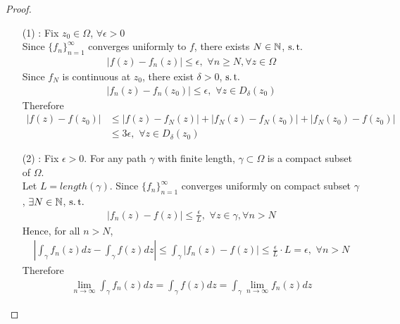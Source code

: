 \begin{thm}
	\newpage
	\begin{proof}
		\begin{enumerate}
			\item[(1)]: Fix $z_0 \in \Omega$, $\forall \epsilon > 0$\\
			Since $\{f_n\}_{n = 1}^{\infty}$ converges uniformly to $f$, there exists $N \in \mathbb{N}$, $\operatorname{s.t.}$
			\begin{align}
				\left| f(z) - f_{n}(z) \right| \leq \epsilon , \,\, \forall n \geq N , \forall z \in \Omega
			\end{align}
			Since $f_N$ is continuous at $z_0$, there exist $\delta > 0$, $\operatorname{s.t.}$
			\begin{align}
				\left| f_{n}(z) - f_{n}(z_0) \right| \leq \epsilon , \,\, \forall z \in D_{\delta}(z_0)
			\end{align}
			Therefore
			\begin{align}
				\left| f(z) - f(z_0) \right| 
				&\leq \left| f(z) - f_{N}(z) \right| + \left| f_{N}(z) - f_{N}(z_0) \right| + \left| f_{N}(z_0) - f(z_0) \right| \\
				&\leq 3 \epsilon , \,\, \forall z \in D_{\delta}(z_0)
			\end{align}
			
			\vspace{2em}
			
			\item[(2)]: Fix $\epsilon > 0$. For any path $\gamma$ with finite length, $\gamma \subset \Omega$ is a compact subset of $\Omega$.\\
			Let $L = length(\gamma)$. Since $\{ f_n \}_{n = 1}^{\infty}$ converges uniformly on compact subset $\gamma$, $\exists N \in \mathbb{N}$, $\operatorname{s.t.}$
			\begin{align}
				\left| f_{n}(z) - f(z) \right| \leq \frac{\epsilon}{L} , \,\, \forall z \in \gamma , \forall n > N
			\end{align}
			Hence, for all $n > N$,
			\begin{align}
				\left| \int_{\gamma}{f_{n}(z) dz} - \int_{\gamma}{f(z) dz} \right| \leq \int_{\gamma}{\left| f_{n}(z) - f(z) \right|} \leq \frac{\epsilon}{L} \cdot L = \epsilon , \,\, \forall n > N
			\end{align}
			Therefore
			\begin{align}
				\lim_{n \to \infty}{\int_{\gamma}{f_{n}(z) dz}} = \int_{\gamma}{f(z) dz} = \int_{\gamma}{\lim_{n \to \infty}{f_{n}(z) dz}}
			\end{align}
			

\end{enumerate}
\end{proof}
\end{thm}
